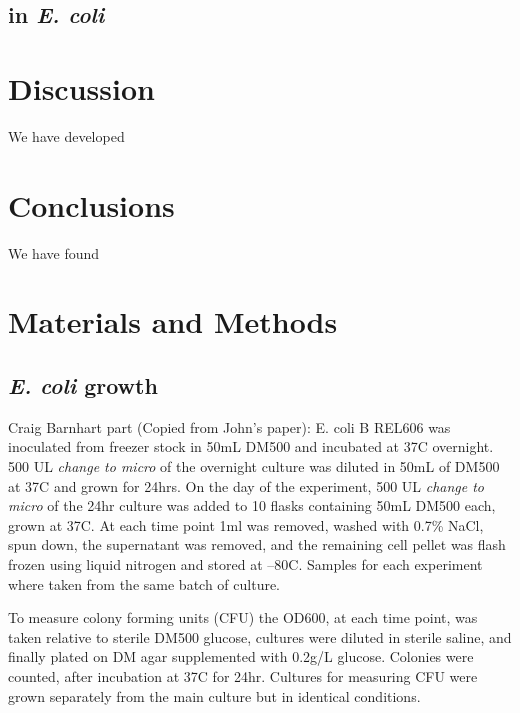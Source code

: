\documentclass[12pt]{article}
\begin{document}
\subsection{ in \emph{E. coli}}

\section{Discussion}

We have developed


\section{Conclusions}

We have found


\section{Materials and Methods}

\subsection{\emph{E. coli} growth} 
Craig Barnhart part (Copied from John’s paper):
E. coli B REL606 was inoculated from freezer stock in 50mL DM500 and incubated at 37C overnight. 500 UL \emph{change to micro} of the overnight culture was diluted in 50mL of DM500 at 37C and grown for 24hrs. On the day of the experiment, 500 UL \emph{change to micro} of the 24hr culture was added to 10 flasks containing 50mL DM500 each, grown at 37C. At each time point 1ml was removed, washed with 0.7\% NaCl, spun down, the supernatant was removed, and the remaining cell pellet was flash frozen using liquid nitrogen and stored at –80C. Samples for each experiment where taken from the same batch of culture. 

To measure colony forming units (CFU) the OD600, at each time point, was taken relative to sterile DM500 glucose, cultures were diluted in sterile saline, and finally plated on DM agar supplemented with 0.2g/L glucose. Colonies were counted, after incubation at 37C for 24hr. Cultures for measuring CFU were grown separately from the main culture but in identical conditions. 
\end{document}
